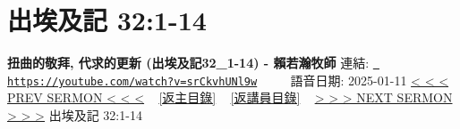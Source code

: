 \documentclass{book}
\begin{document}
\section{出埃及記 32:1-14}
\label{sec:srCkvhUNl9w}
\textbf{扭曲的敬拜, 代求的更新 (出埃及記32\_1-14) -  賴若瀚牧師}
\newline
\newline
連結: \href{https://youtube.com/watch?v=srCkvhUNl9w}{\texttt{ https://youtube.com/watch?v=srCkvhUNl9w}} ~~~~ 語音日期: 2025-01-11 
\newline
\newline
\hyperref[sec:yRzXvTTOZfM]{< < < PREV SERMON < < <}
~
\hyperlink{toc}{[返主目錄]}
~
\hyperref[ch:preacher8]{[返講員目錄]}
~
\hyperref[sec:lTGVgidxHms]{> > > NEXT SERMON > > >}
\newline
\newline
出埃及記 32:1-14
\newline
\end{document}
